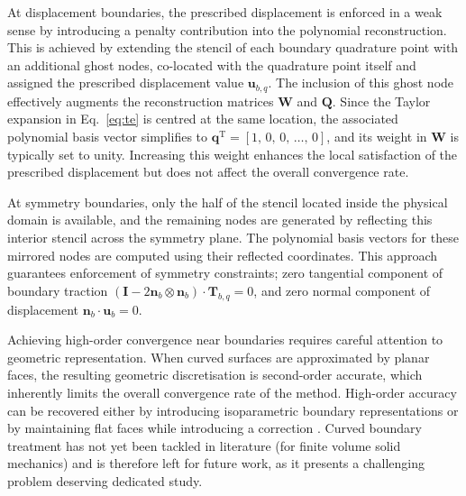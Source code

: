 \documentclass[sn-mathphys,Numbered]{sn-jnl}%
\newcommand{\bb}{\boldsymbol}
\begin{document}
At displacement boundaries, the prescribed displacement is enforced in a weak sense by introducing a penalty contribution into the polynomial reconstruction.
This is achieved by extending the stencil of each boundary quadrature point with an additional ghost nodes, co-located with the quadrature point itself and assigned the prescribed displacement value $\mathbf{u}_{b,q}$.
The inclusion of this ghost node effectively augments the reconstruction matrices $\mathbf{W}$ and $\mathbf{Q}$.
Since the Taylor expansion in Eq.~\eqref{eq:te} is centred at the same location, the associated polynomial basis vector simplifies to
$\mathbf{q}^{\mathrm{T}} = [1,\,0,\,0,\,\dots,\, 0]$, and its weight in $\mathbf{W}$ is typically set to unity.
Increasing this weight enhances the local satisfaction of the prescribed displacement but does not affect the overall convergence rate.

At symmetry boundaries, only the half of the stencil located inside the physical domain is available, and the remaining nodes are generated by reflecting this interior stencil across the symmetry plane. The polynomial basis vectors for these mirrored nodes are computed using their reflected coordinates. This approach guarantees enforcement of symmetry constraints; zero tangential component of boundary traction $(\bb{I}-2\bb{n}_b\otimes\bb{n}_b)\cdot \bb{T}_{b,q}= 0$, and zero normal component of displacement $\bb{n}_b \cdot \bb{u}_b = 0$.

Achieving high-order convergence near boundaries requires careful attention to geometric representation. When curved surfaces are approximated by planar faces, the resulting geometric discretisation is second-order accurate, which inherently limits the overall convergence rate of the method. High-order accuracy can be recovered either by introducing isoparametric boundary representations \cite{Coppeans2026} or by maintaining flat faces while introducing a correction \cite{costa2021, Costa2022, Gooch2002}. Curved boundary treatment has not yet been tackled in literature (for finite volume solid mechanics) and is therefore left for future work, as it presents a challenging problem deserving dedicated study.
%
\end{document}

